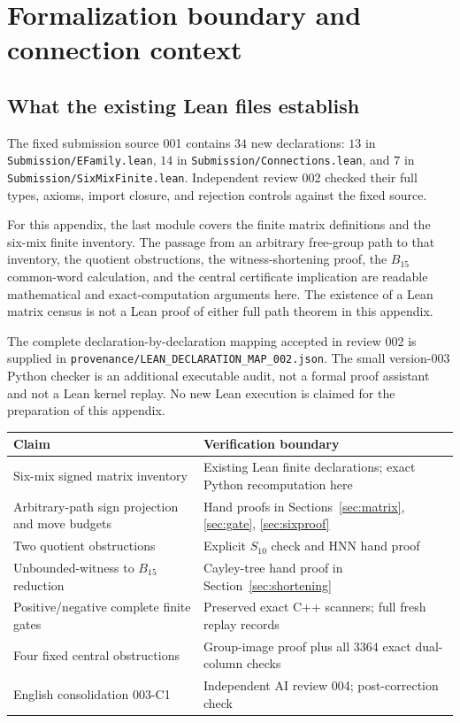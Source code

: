 \documentclass[11pt,a4paper]{article}
\theoremstyle{definition}\newtheorem{definition}[theorem]{Definition}
\theoremstyle{remark}\newtheorem{remark}[theorem]{Remark}
\newcommand{\pathfile}[1]{\nolinkurl{#1}}
\begin{document}
\section{Formalization boundary and connection context}\label{sec:formal}
\subsection{What the existing Lean files establish}
The fixed submission source 001 contains $34$ new declarations: $13$ in
\pathfile{Submission/EFamily.lean}, $14$ in
\pathfile{Submission/Connections.lean}, and $7$ in
\pathfile{Submission/SixMixFinite.lean}. Independent review 002 checked their full types, axioms, import closure, and rejection controls against the fixed source.

For this appendix, the last module covers the finite matrix definitions and the six-mix finite inventory. The passage from an arbitrary free-group path to that inventory, the quotient obstructions, the witness-shortening proof, the $B_{15}$ common-word calculation, and the central certificate implication are readable mathematical and exact-computation arguments here. The existence of a Lean matrix census is not a Lean proof of either full path theorem in this appendix.

The complete declaration-by-declaration mapping accepted in review 002 is supplied in \pathfile{provenance/LEAN_DECLARATION_MAP_002.json}. The small version-003 Python checker is an additional executable audit, not a formal proof assistant and not a Lean kernel replay. No new Lean execution is claimed for the preparation of this appendix.

\begin{center}\small
\begin{tabular}{p{.40\linewidth}p{.48\linewidth}}\toprule
Claim & Verification boundary\\\midrule
Six-mix signed matrix inventory & Existing Lean finite declarations; exact Python recomputation here\\
Arbitrary-path sign projection and move budgets & Hand proofs in Sections~\ref{sec:matrix}, \ref{sec:gate}, \ref{sec:sixproof}\\
Two quotient obstructions & Explicit $S_{10}$ check and HNN hand proof\\
Unbounded-witness to $B_{15}$ reduction & Cayley-tree hand proof in Section~\ref{sec:shortening}\\
Positive/negative complete finite gates & Preserved exact C++ scanners; full fresh replay records\\
Four fixed central obstructions & Group-image proof plus all $3364$ exact dual-column checks\\
English consolidation 003-C1 & Independent AI review 004; post-correction check\\\bottomrule
\end{tabular}
\end{center}
\end{document}
